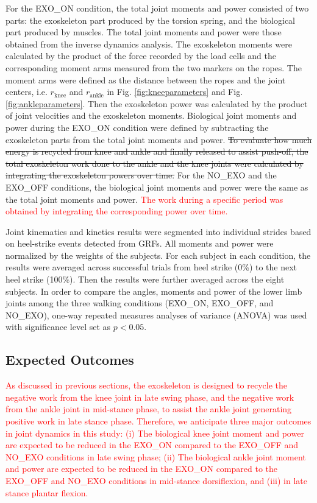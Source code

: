 \documentclass[twocolumn,cleanfoot,10pt]{asme2ej}
\begin{document}
For the EXO\_ON condition, the total joint moments and power consisted of two parts: the exoskeleton part produced by the torsion spring, and the biological part produced by muscles.
The total joint moments and power were those obtained from the inverse dynamics analysis.
The exoskeleton moments were calculated by the product of the force recorded by the load cells and the corresponding moment arms measured from the two markers on the ropes.
The moment arms were defined as the distance between the ropes and the joint centers, i.e. $r_\mathrm{knee}$ and $r_\mathrm{ankle}$ in Fig. \ref{fig:kneeparameters} and Fig. \ref{fig:ankleparameters}.
Then the exoskeleton power was calculated by the product of joint velocities and the exoskeleton moments.
Biological joint moments and power during the EXO\_ON condition were defined by subtracting the exoskeleton parts from the total joint moments and power.
\sout{To evaluate how much energy is recycled from knee and ankle and finally released to assist push-off, the total exoskeleton work done to the ankle and the knee joints were calculated by integrating the exoskeleton powers over time.}
For the NO\_EXO and the EXO\_OFF conditions, the biological joint moments and power were the same as the total joint moments and power.
\textcolor{red}{The work during a specific period was obtained by integrating the corresponding power over time.}

Joint kinematics and kinetics results were segmented into individual strides based on heel-strike events detected from GRFs.
All moments and power were normalized by the weights of the subjects.
For each subject in each condition, the results were averaged across successful trials from heel strike (0\%) to the next heel strike (100\%).
Then the results were further averaged across the eight subjects.
In order to compare the angles, moments and power of the lower limb joints among the three walking conditions (EXO\_ON, EXO\_OFF, and NO\_EXO), one-way repeated measures analyses of variance (ANOVA) was used with significance level set as $p<0.05$.

\subsection{Expected Outcomes}

\textcolor{red}{As discussed in previous sections, the exoskeleton is designed to recycle the negative work from the knee joint in late swing phase, and the negative work from the ankle joint in mid-stance phase, to assist the ankle joint generating positive work in late stance phase.
Therefore, we anticipate three major outcomes in joint dynamics in this study:
(i) The biological knee joint moment and power are expected to be reduced in the EXO\_ON compared to the EXO\_OFF and NO\_EXO conditions in late swing phase;
(ii) The biological ankle joint moment and power are expected to be reduced in the EXO\_ON compared to the EXO\_OFF and NO\_EXO conditions in mid-stance dorsiflexion, and (iii) in late stance plantar flexion.}
\end{document}
